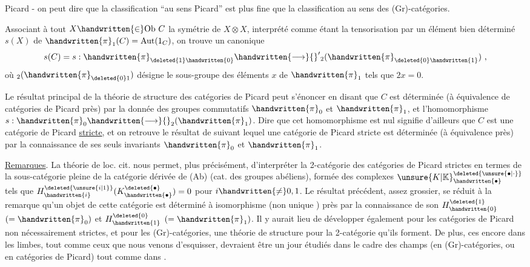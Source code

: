 
Picard - on peut dire que la classification ``au sens Picard'' est plus fine que la classification au sens des (Gr)-catégories. 

Associant à tout $X\handwritten{\in}\mathrm{Ob}\ C$ la symétrie de $X\otimes X$, interprété comme  étant la tensorisation par un élément bien déterminé $s(X)$ de $\handwritten{\pi}_{1}(C)=\mathrm{Aut}(1_C)$, on trouve un  canonique
\[
s(C)=s:\handwritten{\pi}_{\deleted{1}\handwritten{0}}\handwritten{\longrightarrow}{}'{}_{2}(\handwritten{\pi}_{\deleted{0}\handwritten{1}})\ ,
\]
où $ {}_{2}(\handwritten{\pi}_{\deleted{0}1})$ désigne le sous-groupe des éléments $x$ de $\handwritten{\pi}_{1}$ tels que $2x=0$.

Le résultat principal de la théorie de structure des catégories de Picard peut s'énoncer en disant que $C$ est déterminée (à équivalence  de catégories de Picard près) par la donnée des groupes commutatifs $\handwritten{\pi}_{0}$ et $\handwritten{\pi}_{1}$, et l'homomorphisme $s:\handwritten{\pi}_{0}\handwritten{\longrightarrow}{}_{2}(\handwritten{\pi}_{1})$. Dire que cet homomorphisme est nul signifie d'ailleurs que $C$ est une catégorie de Picard \uline{stricte}, et on retrouve le résultat de \handwritten{[\, ]} suivant lequel une catégorie de Picard stricte est déterminée (à équivalence près) par la connaissance de ses seuls invariants $\handwritten{\pi}_{0}$ et $\handwritten{\pi}_{1}$.

\uline{Remarques}. La théorie de loc. cit. nous permet, plus précisément, d'interpréter la 2-catégorie des catégories de Picard strictes en termes de la sous-catégorie pleine de la catégorie dérivée de (Ab) (cat. des groupes abéliens), formée des complexes ${\unsure{K|\mathbb{K}}}^{\deleted{\unsure{\bullet|\cdot}}}_{\handwritten{\bullet}}$ tels que $H^{\deleted{\unsure{i|1}}}_{\handwritten{i}}(K^{\deleted{\bullet}}_{\handwritten{\bullet}})=0$ pour $i\handwritten{\ne}0,1$. Le résultat précédent, assez grossier, se réduit  à la remarque qu'un objet de cette catégorie est déterminé à isomorphisme (non unique \handwritten{!}) près par la connaissance de son $H^{\deleted{1}}_{\handwritten{0}}$ $(=\handwritten{\pi}_{0})$ et $H^{\deleted{0}}_{\handwritten{1}}$ $(=\handwritten{\pi}_{1})$. Il y aurait lieu de développer également pour les catégories de Picard non nécessairement strictes, et pour les (Gr)-catégories, une théorie de structure pour la 2-catégorie qu'ils forment. De plus, ces  encore dans les limbes, tout comme ceux que  nous venons d'esquisser, devraient être un jour  étudiés dans le cadre des champs (en (Gr)-catégories, ou en catégories de Picard) tout comme dans  \handwritten{[\, ]}.

